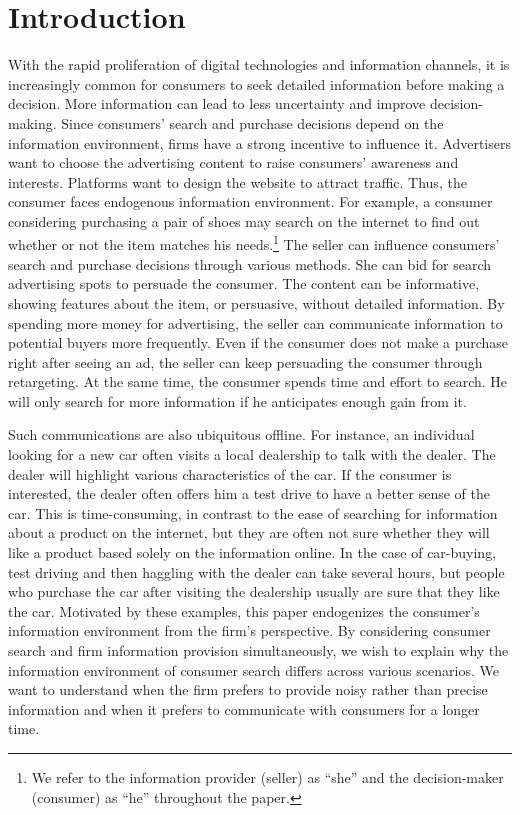 \documentclass[11pt]{extarticle}
\begin{document}
\section{Introduction}
With the rapid proliferation of digital technologies and information channels, it is increasingly common for consumers to seek detailed information before making a decision. More information can lead to less uncertainty and improve decision-making. Since consumers' search and purchase decisions depend on the information environment, firms have a strong incentive to influence it. Advertisers want to choose the advertising content to raise consumers' awareness and interests. Platforms want to design the website to attract traffic. Thus, the consumer faces endogenous information environment. For example, a consumer considering purchasing a pair of shoes may search on the internet to find out whether or not the item matches his needs.\footnote{We refer to the information provider (seller) as ``she'' and the decision-maker (consumer) as ``he'' throughout the paper.} The seller can influence consumers' search and purchase decisions through various methods. She can bid for search advertising spots to persuade the consumer. The content can be informative, showing features about the item, or persuasive, without detailed information. By spending more money for advertising, the seller can communicate information to potential buyers more frequently. Even if the consumer does not make a purchase right after seeing an ad, the seller can keep persuading the consumer through retargeting. At the same time, the consumer spends time and effort to search. He will only search for more information if he anticipates enough gain from it. 

Such communications are also ubiquitous offline. For instance, an individual looking for a new car often visits a local dealership to talk with the dealer. The dealer will highlight various characteristics of the car. If the consumer is interested, the dealer often offers him a test drive to have a better sense of the car. This is time-consuming, in contrast to the ease of searching for information about a product on the internet, but they are often not sure whether they will like a product based solely on the information online. In the case of car-buying, test driving and then haggling with the dealer can take several hours, but people who purchase the car after visiting the dealership usually are sure that they like the car. Motivated by these examples, this paper endogenizes the consumer's information environment from the firm's perspective. %
By considering consumer search and firm information provision simultaneously, we wish to explain why the information environment of consumer search differs across various scenarios. We want to understand when the firm prefers to provide noisy rather than precise information and when it prefers to communicate with consumers for a longer time.
\end{document}
